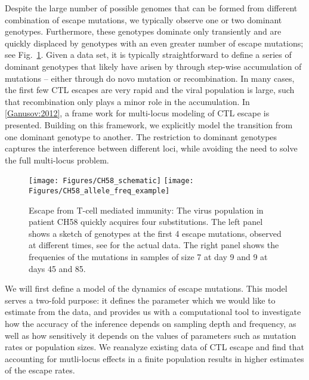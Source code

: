 \documentclass[rmp,twocolumn]{revtex4}
\newcommand{\FIG}[1]{Fig.~\ref{fig:#1}}
\begin{document}
Despite the large number of possible genomes that can be formed from different
combination of escape mutations, we typically observe one or two dominant
genotypes. Furthermore, these genotypes dominate only transiently and are
quickly displaced by genotypes with an even greater number of escape mutations;
see \FIG{data_example}. Given a data set, it is typically straightforward to
define a series of dominant genotypes that likely have arisen by through
step-wise accumulation of mutations -- either through do novo mutation or
recombination. In many cases, the first few CTL escapes are very rapid and the
viral population is large, such that recombination only plays a minor role in
the accumulation. In \ref{Ganusov:2012}, a frame work for multi-locus modeling
of CTL escape is presented. Building on this framework, we explicitly model the
transition from one dominant genotype to another. The restriction to dominant
genotypes captures the interference between different loci, while avoiding
the need to solve the full multi-locus problem.


\begin{figure}[htp]
\begin{center}
  \texttt{[image: Figures/CH58\_schematic]}
  \texttt{[image: Figures/CH58\_allele\_freq\_example]}
  \caption[labelInTOC]{Escape from T-cell mediated immunity: The virus
  population in patient CH58 quickly acquires four substitutions. The left
  panel shows a sketch of genotypes at the first 4 escape mutations, observed
  at different times, see \citep{SalazarGonzalez:2009p35091,Goonetilleke:2009p42296} for the actual
  data. The right panel shows the frequenies of the mutations in samples of size 7 at day 9 and 9 at days 45
  and 85.}
  \label{fig:data_example}
\end{center}
\end{figure}

We will first define a model of the dynamics of escape mutations. This model
serves a two-fold purpose: it defines the parameter which we would like to
estimate from the data, and provides us with a computational tool to
investigate how the accuracy of the inference depends on sampling depth and
frequency, as well as how sensitively it depends on the values of parameters
such as mutation rates or population sizes. We reanalyze existing data of CTL
escape and find that accounting for mutli-locus effects in a finite population
results in higher estimates of the escape rates.
\end{document}
